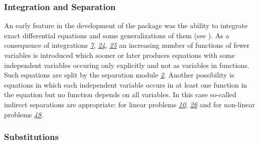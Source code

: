 \subsubsection{Integration and Separation}

An early feature in the development of the package  was
the ability to integrate exact differential equations and some
generalizations of them (see \cite{Wolf:2000}).  As a consequence of
integrations \hyperref[crack-m_7]{\emph{7}},
\hyperref[crack-m_24]{\emph{24}}, \hyperref[crack-m_25]{\emph{25}} an
increasing number of functions of fewer variables is introduced which
sooner or later produces equations with some independent variables
occuring only explicitly and not as variables in functions.  Such
equations are split by the separation module
\hyperref[crack-m_2]{\emph{2}}.  Another possibility is equations in
which each independent variable occurs in at least one function in the
equation but no function depends on all variables.  In this case
so-called indirect separations are appropriate: for linear problems
\hyperref[crack-m_10]{\emph{10}}, \hyperref[crack-m_26]{\emph{26}} and
for non-linear problems \hyperref[crack-m_48]{\emph{48}}.

\subsubsection{Substitutions}

